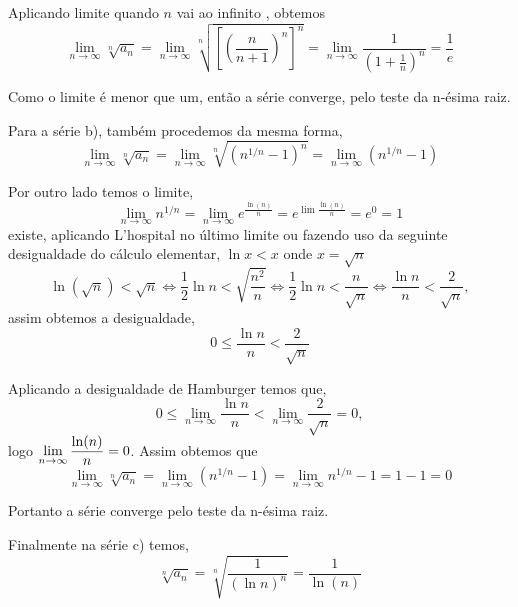 Aplicando limite quando $n$ vai ao infinito , obtemos
\begin{equation*}
\lim_{n\to\infty}\sqrt[n]{a_n}=
\lim_{n\to\infty}\sqrt[n]{\left[
\left(\frac{n}{n+1}\right)^n\right]^n}=
\lim_{n\to\infty}\frac{1}{\left(1+\frac{1}{n}\right)^n}=\frac{1}{e}
\end{equation*}

Como o limite \'{e} menor que um, ent\~{a}o a s\'{e}rie converge, pelo teste
da n-\'{e}sima raiz.

Para a s\'{e}rie b), tamb\'{e}m procedemos da mesma forma,
\begin{equation*}
    \lim_{n\to\infty}\sqrt[n]{a_n}=\lim_{n\to\infty}\sqrt[n]{(n^{1/n}-1)^n}=\lim_{n\to\infty}(n^{1/n}-1)
\end{equation*}

Por outro lado temos o  limite,
\begin{equation*}
    \lim_{n\to\infty}n^{1/n}=\lim_{n\to\infty}e^{\frac{\ln(n)}{n}}=e^{\lim\frac{\ln(n)}{n}}=e^0=1
\end{equation*}
existe, aplicando L'hospital no \'{u}ltimo limite ou fazendo uso da
seguinte desigualdade do c\'{a}lculo elementar, $\ln x<x$ onde
$x=\sqrt{n}$
\begin{equation*}
\ln(\sqrt{n})<\sqrt{n}\Leftrightarrow \frac{1}{2}\ln
n<\sqrt{\frac{n^2}{n}}\Leftrightarrow\frac{1}{2}\ln
n<\frac{n}{\sqrt{n}}\Leftrightarrow\frac{\ln
n}{n}<\frac{2}{\sqrt{n}},
\end{equation*}
assim obtemos a desigualdade,
\begin{equation*}
    0\le \frac{\ln
n}{n}<\frac{2}{\sqrt{n}}
\end{equation*}

Aplicando a desigualdade de Hamburger temos que,
\begin{equation*}
    0\le \lim_{n\to\infty}\frac{\ln
n}{n}<\lim_{n\to\infty}\frac{2}{\sqrt{n}}=0,
\end{equation*}
logo $\displaystyle{\lim_{n\to\infty}\frac{\ln(n)}{n}=0}$. Assim obtemos
que
\begin{equation*}
 \lim_{n\to\infty}\sqrt[n]{a_n}=\lim_{n\to\infty}(n^{1/n}-1)=\lim_{n\to\infty}n^{1/n}-1=1-1=0
\end{equation*}

Portanto a s\'{e}rie converge pelo teste da n-\'{e}sima raiz.

Finalmente na s\'{e}rie c) temos,
\begin{equation*}
    \sqrt[n]{a_n}=\sqrt[n]{\frac{1}{(\ln n)^n}}=\frac{1}{\ln(n)}
\end{equation*}

